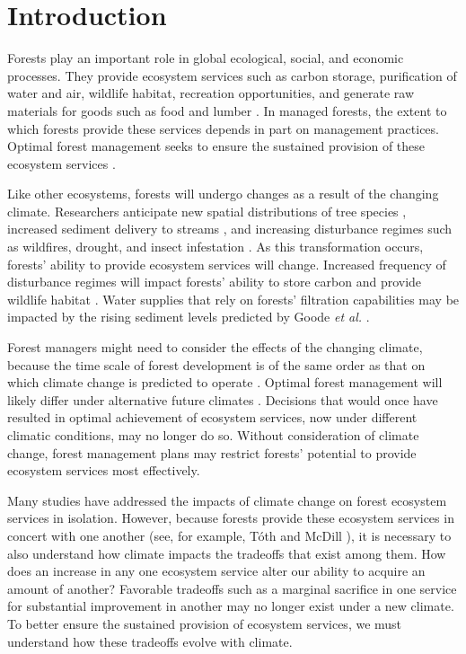 
\section{Introduction}
 
Forests play an important role in global ecological, social, and economic processes. They provide ecosystem services such as carbon storage, purification of water and air, wildlife habitat, recreation opportunities, and generate raw materials for goods such as food and lumber \cite{daily1997ecosystem}. In managed forests, the extent to which forests provide these services depends in part on management practices. Optimal forest management seeks to ensure the sustained provision of these ecosystem services \cite{cfrForestMgmt}.

Like other ecosystems, forests will undergo changes as a result of the changing climate. Researchers anticipate new spatial distributions of tree species \cite{iverson1998predicting}, increased sediment delivery to streams \cite{Goode20121}, and increasing disturbance regimes such as wildfires, drought, and insect infestation \cite{vose2012effects}. As this transformation occurs, forests' ability to provide ecosystem services will change. Increased frequency of disturbance regimes will impact forests' ability to store carbon \cite{bonan2008forests} and provide wildlife habitat \cite{mckenzie2004climatic}. Water supplies that rely on forests' filtration capabilities may be impacted by the rising sediment levels predicted by Goode \textit{et al.} \cite{Goode20121}.

Forest managers might need to consider the effects of the changing climate, because the time scale of forest development is of the same order as that on which climate change is predicted to operate \cite{ipcc2013climate}. Optimal forest management will likely differ under alternative future climates \cite{linder2000developing}. Decisions that would once have resulted in optimal achievement of ecosystem services, now under different climatic conditions, may no longer do so. Without consideration of climate change, forest management plans may restrict forests' potential to provide ecosystem services most effectively.

Many studies have addressed the impacts of climate change on forest ecosystem services in isolation\cite{vose2012effects}\cite{bonan2008forests}\cite{mckenzie2004climatic}. However, because forests provide these ecosystem services in concert with one another (see, for example, T{\'o}th and McDill \cite{toth2009finding}), it is necessary to also understand how climate impacts the tradeoffs that exist among them. How does an increase in any one ecosystem service alter our ability to acquire an amount of another? Favorable tradeoffs such as a marginal sacrifice in one service for substantial improvement in another may no longer exist under a new climate. To better ensure the sustained provision of ecosystem services, we must understand how these tradeoffs evolve with climate.

